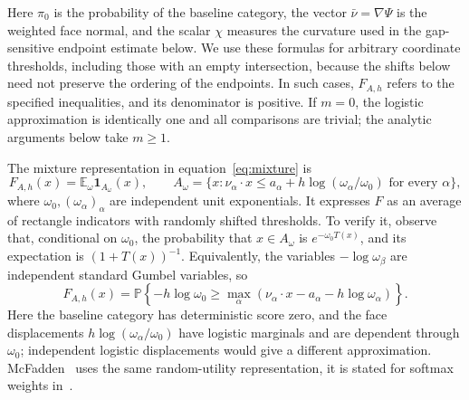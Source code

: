 \documentclass[11pt,letterpaper]{article}
\theoremstyle{remark}
\newcommand{\E}{\mathbb E}
\newcommand{\Pp}{\mathbb P}
\newcommand{\ind}{\mathbf 1}
\begin{document}
Here \(\pi_0\) is the probability of the baseline category, the
vector \(\bar\nu=\nabla\Psi\) is the weighted face normal, and
the scalar \(\chi\) measures the curvature used in the gap-sensitive
endpoint estimate below. We use these formulas for arbitrary
coordinate thresholds, including those with an empty intersection,
because the shifts below need not preserve the ordering of the
endpoints. In such cases, \(F_{A,h}\) refers to the specified
inequalities, and its denominator is positive. If \(m=0\), the logistic
approximation is identically one and all comparisons are trivial; the
analytic arguments below take \(m\ge1\).

The mixture representation in equation~\eqref{eq:mixture} is
\[
 F_{A,h}(x)=\E_\omega\ind_{A_\omega}(x),\qquad
 A_\omega=\{x:\nu_\alpha\cdot x\le
 a_\alpha+h\log(\omega_\alpha/\omega_0)\text{ for every }\alpha\},
\]
where \(\omega_0,(\omega_\alpha)_\alpha\) are independent unit
exponentials. It expresses \(F\) as an average of rectangle indicators
with randomly shifted thresholds. To verify it, observe that, conditional on
\(\omega_0\), the probability that \(x\in A_{\omega}\) is
\(e^{-\omega_0T(x)}\), and its expectation is \((1+T(x))^{-1}\).
Equivalently, the variables \(-\log\omega_\beta\) are independent standard
Gumbel variables, so
\[
 F_{A,h}(x)=\Pp\!\left\{-h\log\omega_0\ge
 \max_\alpha(\nu_\alpha\cdot x-a_\alpha-h\log\omega_\alpha)\right\}.
\]
Here the baseline category has deterministic score zero, and the face
displacements \(h\log(\omega_\alpha/\omega_0)\) have logistic marginals and are
dependent through \(\omega_0\); independent logistic displacements would give
a different approximation. McFadden~\cite[p.~1001]{McFadden1989} uses
the same random-utility representation, it is stated for softmax weights in~\cite[Lemma~14]{GaoZhang}. 
\end{document}
